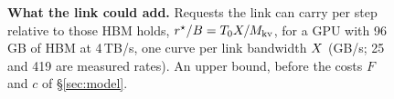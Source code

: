 \begin{figure}[t]
\caption{\textbf{What the link could add.} Requests the link can carry per step
relative to those HBM holds, $r^{\star}/B = T_0X/M_{\mathrm{kv}}$, for a GPU with
96\,GB of HBM at 4\,TB/s, one curve per link bandwidth $X$ (GB/s; 25 and
419 are measured rates). An upper bound, before the costs $F$ and $c$ of
\S\ref{sec:model}.}
\label{fig:potential}
\end{figure}
